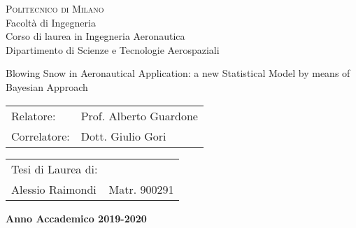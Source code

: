 
\thispagestyle{empty}
\enlargethispage{60mm}
\begin{center}
\Large{\textsc{Politecnico di Milano}}\\
\large{Facolt\`a di Ingegneria}\\
\large{Corso di laurea in Ingegneria Aeronautica}\\
\large{Dipartimento di Scienze e Tecnologie Aerospaziali}\\
\vspace{7mm}
\begin{figure}[h]
\begin{center}
\end{center}
\end{figure}
\vspace{2mm}

\begin{LARGE}
Blowing Snow in Aeronautical Application: a new Statistical Model by means of Bayesian Approach
\end{LARGE}
\vspace{25mm}

\begin{flushleft}
\begin{tabular}{l l }
Relatore:    & Prof. Alberto Guardone\\
Correlatore: & Dott. Giulio Gori\\
\end{tabular}
\end{flushleft}
\vspace{25mm}

\begin{flushright}
\begin{tabular}{l l }
Tesi di Laurea di: & \\
Alessio Raimondi & Matr. 900291
\end{tabular}
\end{flushright}
\vspace{43mm}
{\large{\bf Anno Accademico 2019-2020}}
\end{center}